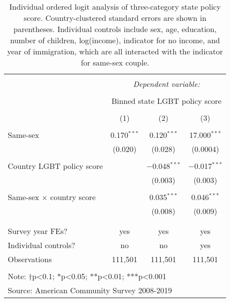 \documentclass[
  11pt,
]{article}
\begin{document}
\begin{table}[!htbp] \centering 
  \caption{Individual ordered logit analysis of three-category state policy score. Country-clustered standard errors are shown in parentheses. Individual controls include sex, age, education, number of children, log(income), indicator for no income, and year of immigration, which are all interacted with the indicator for same-sex couple.} 
  \label{tab:ord} 
\begin{tabular}{@{\extracolsep{5pt}}lccc} 
\\[-1.8ex]\hline 
\hline \\[-1.8ex] 
 & \multicolumn{3}{c}{\textit{Dependent variable:}} \\ 
\cline{2-4} 
\\[-1.8ex] & \multicolumn{3}{c}{Binned state LGBT policy score} \\ 
\\[-1.8ex] & (1) & (2) & (3)\\ 
\hline \\[-1.8ex] 
 Same-sex & 0.170$^{***}$ & 0.120$^{***}$ & 17.000$^{***}$ \\ 
  & (0.020) & (0.028) & (0.0004) \\ 
  & & & \\ 
 Country LGBT policy score &  & $-$0.048$^{***}$ & $-$0.017$^{***}$ \\ 
  &  & (0.003) & (0.003) \\ 
  & & & \\ 
 Same-sex × country score &  & 0.035$^{***}$ & 0.046$^{***}$ \\ 
  &  & (0.008) & (0.009) \\ 
  & & & \\ 
\hline \\[-1.8ex] 
Survey year FEs? & yes & yes & yes \\ 
Individual controls? & no & no & yes \\ 
Observations & 111,501 & 111,501 & 111,501 \\ 
\hline 
\hline \\[-1.8ex] 
\multicolumn{4}{l}{Note: †p<0.1; *p<0.05; **p<0.01; ***p<0.001} \\ 
\multicolumn{4}{l}{Source: American Community Survey 2008-2019} \\ 
\end{tabular} 
\end{table}
\end{document}
